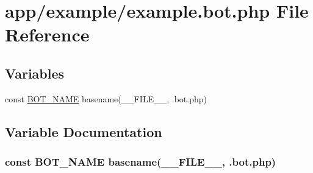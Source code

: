 \hypertarget{example_8bot_8php}{}\section{app/example/example.bot.\+php File Reference}
\label{example_8bot_8php}
\subsection*{Variables}
\begin{DoxyCompactItemize}
\item 
const \hyperlink{example_8bot_8php_a089257da3946b52574ebf3170ccfd78e}{B\+O\+T\+\_\+\+N\+A\+ME} basename(\+\_\+\+\_\+\+F\+I\+L\+E\+\_\+\+\_\+, \textquotesingle{}.bot.\+php\textquotesingle{})
\end{DoxyCompactItemize}


\subsection{Variable Documentation}
\subsubsection[{\texorpdfstring{B\+O\+T\+\_\+\+N\+A\+ME}{BOT_NAME}}]{\setlength{\rightskip}{0pt plus 5cm}const B\+O\+T\+\_\+\+N\+A\+ME basename(\+\_\+\+\_\+\+F\+I\+L\+E\+\_\+\+\_\+, \textquotesingle{}.bot.\+php\textquotesingle{})}\hypertarget{example_8bot_8php_a089257da3946b52574ebf3170ccfd78e}{}\label{example_8bot_8php_a089257da3946b52574ebf3170ccfd78e}
